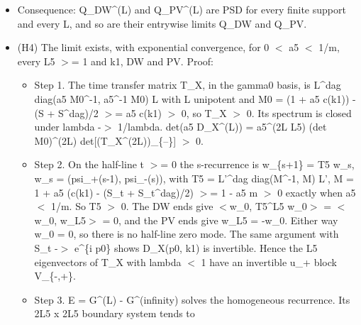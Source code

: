 \documentclass[11pt,a4paper]{article}
\begin{document}
\begin{itemize}
\begin{itemize}
\begin{itemize}
is the same. The open ends of D\_DW and the wall term m\_f (P\_+ $|$1$>$$<$L5$|$ + P\_- $|$L5$>$$<$1$|$) of D\_PV map the same way.
\item{} Hence C D\_X[U] C\textasciicircum{}(-1) = D\_X[conj U]\textasciicircum{}T, and det D\_X[U] = det D\_X[conj U]. With U = e\textasciicircum{}\{iA\} times a fixed twist
e\textasciicircum{}\{i phi\_s\} on the spatial wrap links, conj U carries -A and the twist -phi\_s. The two determinants agree, as
functions of A, exactly when -phi\_s = phi\_s mod 2 pi, i.e. phi\_s in \{0, pi\}. Then det D\_X[A] = det D\_X[-A],
and every first derivative at A = 0 vanishes.
\end{itemize}

\end{itemize}

\item{} Consequence: Q\_DW\textasciicircum{}(L) and Q\_PV\textasciicircum{}(L) are PSD for every finite support and every L, and so are their entrywise limits
Q\_DW and Q\_PV.
\item{} (H4) The limit exists, with exponential convergence, for 0 $<$ a5 $<$ 1/m, every L5 $>$= 1 and k1, DW and PV.
Proof:
\begin{itemize}
\item{} Step 1. The time transfer matrix T\_X, in the gamma0 basis, is L\textasciicircum{}dag diag(a5 M0\textasciicircum{}-1, a5\textasciicircum{}-1 M0) L with L unipotent
and M0 = (1 + a5 c(k1)) - (S + S\textasciicircum{}dag)/2 $>$= a5 c(k1) $>$ 0, so T\_X $>$ 0. Its spectrum is closed under
lambda -$>$ 1/lambda. det(a5 D\_X\textasciicircum{}(L)) = a5\textasciicircum{}(2L L5) (det M0)\textasciicircum{}(2L) det[(T\_X\textasciicircum{}(2L))\_\{--\}] $>$ 0.
\item{} Step 2. On the half-line t $>$= 0 the s-recurrence is w\_\{s+1\} = T5 w\_s, w\_s = (psi\_+(s-1), psi\_-(s)), with
T5 = L'\textasciicircum{}dag diag(M\textasciicircum{}-1, M) L', M = 1 + a5 (c(k1) - (S\_t + S\_t\textasciicircum{}dag)/2) $>$= 1 - a5 m $>$ 0 exactly when a5 $<$ 1/m. So
T5 $>$ 0. The DW ends give $<$w\_0, T5\textasciicircum{}L5 w\_0$>$ = $<$w\_0, w\_L5$>$ = 0, and the PV ends give w\_L5 = -w\_0. Either way w\_0 = 0,
so there is no half-line zero mode. The same argument with S\_t -$>$ e\textasciicircum{}\{i p0\} shows D\_X(p0, k1) is invertible.
Hence the L5 eigenvectors of T\_X with lambda $<$ 1 have an invertible u\_+ block V\_\{-,+\}.
\item{} Step 3. E = G\textasciicircum{}(L) - G\textasciicircum{}(infinity) solves the homogeneous recurrence. Its 2L5 x 2L5 boundary system tends to

\end{itemize}
\end{itemize}
\end{document}
